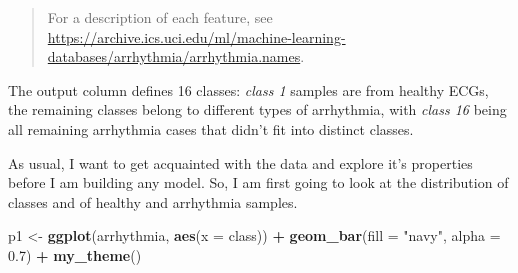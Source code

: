 \documentclass[]{book}
\newenvironment{Shaded}{\begin{snugshade}}{\end{snugshade}}
\newcommand{\CommentTok}[1]{\textcolor[rgb]{0.56,0.35,0.01}{\textit{#1}}}
\newcommand{\DataTypeTok}[1]{\textcolor[rgb]{0.13,0.29,0.53}{#1}}
\newcommand{\DecValTok}[1]{\textcolor[rgb]{0.00,0.00,0.81}{#1}}
\newcommand{\FloatTok}[1]{\textcolor[rgb]{0.00,0.00,0.81}{#1}}
\newcommand{\KeywordTok}[1]{\textcolor[rgb]{0.13,0.29,0.53}{\textbf{#1}}}
\newcommand{\NormalTok}[1]{#1}
\newcommand{\OperatorTok}[1]{\textcolor[rgb]{0.81,0.36,0.00}{\textbf{#1}}}
\newcommand{\OtherTok}[1]{\textcolor[rgb]{0.56,0.35,0.01}{#1}}
\newcommand{\StringTok}[1]{\textcolor[rgb]{0.31,0.60,0.02}{#1}}
\begin{document}
\begin{quote}
For a description of each feature, see \url{https://archive.ics.uci.edu/ml/machine-learning-databases/arrhythmia/arrhythmia.names}.
\end{quote}

The output column defines 16 classes: \emph{class 1} samples are from healthy ECGs, the remaining classes belong to different types of arrhythmia, with \emph{class 16} being all remaining arrhythmia cases that didn't fit into distinct classes.

\begin{Shaded}
\end{Shaded}

As usual, I want to get acquainted with the data and explore it's properties before I am building any model. So, I am first going to look at the distribution of classes and of healthy and arrhythmia samples.

\begin{Shaded}
\begin{Highlighting}[]
\NormalTok{p1 <-}\StringTok{ }\KeywordTok{ggplot}\NormalTok{(arrhythmia, }\KeywordTok{aes}\NormalTok{(}\DataTypeTok{x =}\NormalTok{ class)) }\OperatorTok{+}
\StringTok{  }\KeywordTok{geom_bar}\NormalTok{(}\DataTypeTok{fill =} \StringTok{"navy"}\NormalTok{, }\DataTypeTok{alpha =} \FloatTok{0.7}\NormalTok{) }\OperatorTok{+}
\StringTok{  }\KeywordTok{my_theme}\NormalTok{()}
\end{Highlighting}
\end{Shaded}
\end{document}
